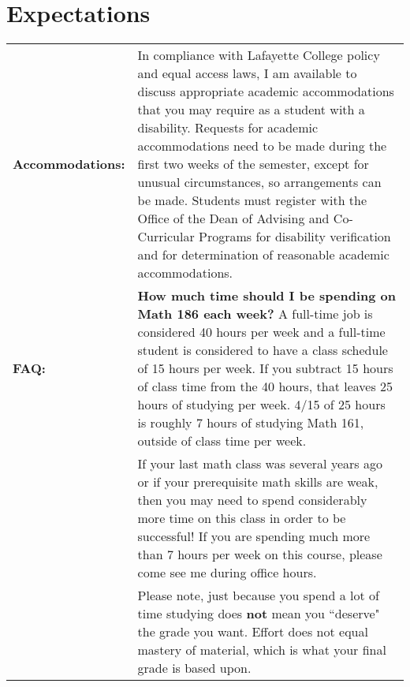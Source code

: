 \documentclass[10pt]{amsart}
\begin{document}
  \section*{Expectations}
\noindent
\begin{tabular}{p{1.4in}p{5in}}
  {\bf Accommodations:} & In compliance with Lafayette College policy and equal access laws, I am available to discuss appropriate academic accommodations that you may require as a student with a disability.  Requests for academic accommodations need to be made during the first two weeks of the semester, except for unusual circumstances, so arrangements can be made.  Students must register with the Office of the Dean of Advising and Co-Curricular Programs for disability verification and for determination of reasonable academic accommodations.\\
  {\bf FAQ:} & {\bf How much time should I be spending on Math 186 each week?} A full-time job is considered 40 hours per week and a full-time student is considered to have a class schedule of 15 hours per week. If you subtract 15 hours of class time from the 40 hours, that leaves 25 hours of studying per week.  4/15 of 25 hours is roughly 7 hours of studying Math 161, outside of class time per week.\\
& If your last math class was several years ago or if your prerequisite math skills are weak, then you may need to spend considerably more time on this class in order to be successful!  If you are spending much more than 7 hours per week on this course, please come see me during office hours.\\
& Please note, just because you spend a lot of time studying does {\bf not} mean you ``deserve" the grade you want.  Effort does not equal mastery of material, which is what your final grade is based upon.
\end{tabular}
\end{document}
